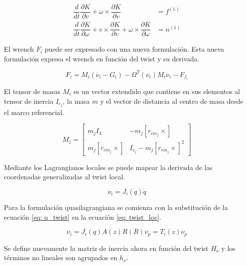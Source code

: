 \begin{subequations}\label{eq: kirchoff}
 \begin{align}
  \dfrac{d}{dt} \dfrac{\partial K}{\partial   v} +   \omega \times \dfrac{\partial K}{\partial   v} &=   f^{(1)}\\
  \dfrac{d}{dt} \dfrac{\partial K}{\partial   \omega} +   v \times \dfrac{\partial K}{\partial   v}  +   \omega \times \dfrac{\partial K}{\partial   \omega} &=   n^{(1)}
 \end{align}
\end{subequations}

El wrench $F_i$ puede ser expresado con  una nueva formulación.
Esta nueva formulación expresa el wrench en función del twist y su derivada.

\begin{equation}
F_i = M_i(\dot{\nu_i} - G_i) - \Omega^T(\nu_i)M_i\nu_i - F_{f_{i}}
\end{equation}

El tensor de masas $M_i$ es un vector extendido que contiene en sus elementos al tensor de inercia $I_{c_j}$, la masa $m$ y el vector de distancia al centro de masa desde el marco referencial.

\begin{equation}
 M_j = \begin{bmatrix}
        m_j I_3 & -m_j [  r_{cm_j} \times]\\
        m_j [  r_{cm_j} \times] & I_{c_j} -m_j [  r_{cm_j} \times]^2
       \end{bmatrix}
\end{equation}

Mediante los Lagrangianos locales se puede mapear la derivada de las coordenadas generalizadas al twist local.

\begin{equation} \label{eq: twist_loc}
\nu_i = J_i(q)\dot{q}
\end{equation}

Para la formulación quasilagrangiana se comienza con la substitución de la ecuación 
\eqref{eq: q_twist} en la ecuación \eqref{eq: twist_loc}.

\begin{equation}
\nu_i = J_i(q) A(z) R(R) \nu_p = T_i(z) \nu_p
\end{equation}

Se define nuevamente la matriz de inercia ahora en función del twist $H_\nu$ y los términos no lineales son agrupados en $h_\nu$.

